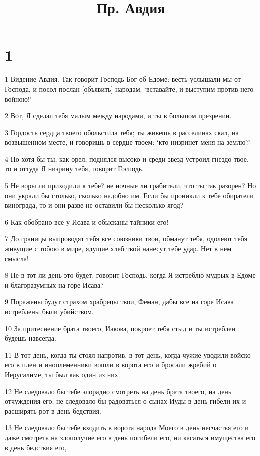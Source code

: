 

\title{Пр. Авдия}


\chapter{1}

\par 1 Видение Авдия. Так говорит Господь Бог об Едоме: весть услышали мы от Господа, и посол послан [объявить] народам: `вставайте, и выступим против него войною!'
\par 2 Вот, Я сделал тебя малым между народами, и ты в большом презрении.
\par 3 Гордость сердца твоего обольстила тебя; ты живешь в расселинах скал, на возвышенном месте, и говоришь в сердце твоем: `кто низринет меня на землю?'
\par 4 Но хотя бы ты, как орел, поднялся высоко и среди звезд устроил гнездо твое, то и оттуда Я низрину тебя, говорит Господь.
\par 5 Не воры ли приходили к тебе? не ночные ли грабители, что ты так разорен? Но они украли бы столько, сколько надобно им. Если бы проникли к тебе обиратели винограда, то и они разве не оставили бы несколько ягод?
\par 6 Как обобрано все у Исава и обысканы тайники его!
\par 7 До границы выпроводят тебя все союзники твои, обманут тебя, одолеют тебя живущие с тобою в мире, ядущие хлеб твой нанесут тебе удар. Нет в нем смысла!
\par 8 Не в тот ли день это будет, говорит Господь, когда Я истреблю мудрых в Едоме и благоразумных на горе Исава?
\par 9 Поражены будут страхом храбрецы твои, Феман, дабы все на горе Исава истреблены были убийством.
\par 10 За притеснение брата твоего, Иакова, покроет тебя стыд и ты истреблен будешь навсегда.
\par 11 В тот день, когда ты стоял напротив, в тот день, когда чужие уводили войско его в плен и иноплеменники вошли в ворота его и бросали жребий о Иерусалиме, ты был как один из них.
\par 12 Не следовало бы тебе злорадно смотреть на день брата твоего, на день отчуждения его; не следовало бы радоваться о сынах Иуды в день гибели их и расширять рот в день бедствия.
\par 13 Не следовало бы тебе входить в ворота народа Моего в день несчастья его и даже смотреть на злополучие его в день погибели его, ни касаться имущества его в день бедствия его,
